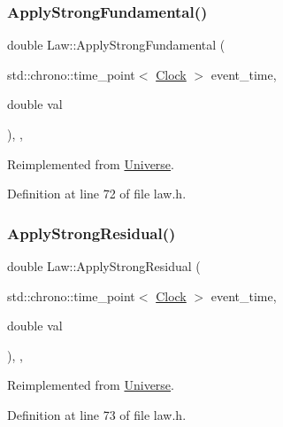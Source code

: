 \subsubsection{\texorpdfstring{Apply\+Strong\+Fundamental()}{ApplyStrongFundamental()}}
{\footnotesize\ttfamily double Law\+::\+Apply\+Strong\+Fundamental (\begin{DoxyParamCaption}\item[{std\+::chrono\+::time\+\_\+point$<$ \hyperlink{universe_8h_a0ef8d951d1ca5ab3cfaf7ab4c7a6fd80}{Clock} $>$}]{event\+\_\+time,  }\item[{double}]{val }\end{DoxyParamCaption})\hspace{0.3cm}{\ttfamily [inline]}, {\ttfamily [final]}, {\ttfamily [virtual]}}



Reimplemented from \hyperlink{class_universe_a62789bcff84bd750b0366004381e2fdd}{Universe}.



Definition at line 72 of file law.\+h.

\mbox{\label{class_law_a266f86cdcc01e813249a2f192ab85eb3}} 
\subsubsection{\texorpdfstring{Apply\+Strong\+Residual()}{ApplyStrongResidual()}}
{\footnotesize\ttfamily double Law\+::\+Apply\+Strong\+Residual (\begin{DoxyParamCaption}\item[{std\+::chrono\+::time\+\_\+point$<$ \hyperlink{universe_8h_a0ef8d951d1ca5ab3cfaf7ab4c7a6fd80}{Clock} $>$}]{event\+\_\+time,  }\item[{double}]{val }\end{DoxyParamCaption})\hspace{0.3cm}{\ttfamily [inline]}, {\ttfamily [final]}, {\ttfamily [virtual]}}



Reimplemented from \hyperlink{class_universe_af7becebb347be9a85541d96a3eca1ca7}{Universe}.



Definition at line 73 of file law.\+h.

\mbox{\label{class_law_a96ddd42403e3665c6070283ac201658d}} 
